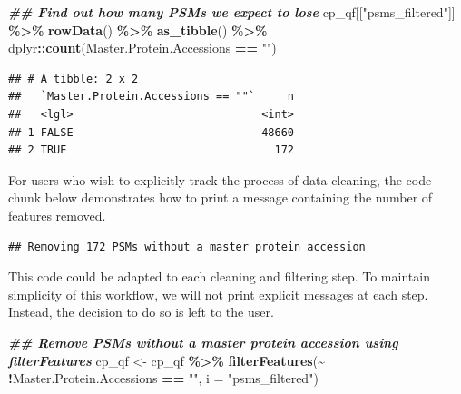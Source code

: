 \documentclass[9pt,a4paper,]{extarticle}
\newenvironment{Shaded}{\begin{snugshade}}{\end{snugshade}}
\newcommand{\AttributeTok}[1]{\textcolor[rgb]{0.13,0.29,0.53}{#1}}
\newcommand{\DocumentationTok}[1]{\textcolor[rgb]{0.56,0.35,0.01}{\textbf{\textit{#1}}}}
\newcommand{\FunctionTok}[1]{\textcolor[rgb]{0.13,0.29,0.53}{\textbf{#1}}}
\newcommand{\NormalTok}[1]{#1}
\newcommand{\OtherTok}[1]{\textcolor[rgb]{0.56,0.35,0.01}{#1}}
\newcommand{\SpecialCharTok}[1]{\textcolor[rgb]{0.81,0.36,0.00}{\textbf{#1}}}
\newcommand{\StringTok}[1]{\textcolor[rgb]{0.31,0.60,0.02}{#1}}
\begin{document}
\begin{Shaded}
\begin{Highlighting}[]
\DocumentationTok{\#\# Find out how many PSMs we expect to lose}
\NormalTok{cp\_qf[[}\StringTok{"psms\_filtered"}\NormalTok{]] }\SpecialCharTok{\%\textgreater{}\%} 
  \FunctionTok{rowData}\NormalTok{() }\SpecialCharTok{\%\textgreater{}\%} 
  \FunctionTok{as\_tibble}\NormalTok{() }\SpecialCharTok{\%\textgreater{}\%} 
\NormalTok{  dplyr}\SpecialCharTok{::}\FunctionTok{count}\NormalTok{(Master.Protein.Accessions }\SpecialCharTok{==} \StringTok{""}\NormalTok{)}
\end{Highlighting}
\end{Shaded}

\begin{verbatim}
## # A tibble: 2 x 2
##   `Master.Protein.Accessions == ""`     n
##   <lgl>                             <int>
## 1 FALSE                             48660
## 2 TRUE                                172
\end{verbatim}

For users who wish to explicitly track the process of data cleaning, the code
chunk below demonstrates how to print a message containing the number of features
removed.

\begin{Shaded}
\end{Shaded}

\begin{verbatim}
## Removing 172 PSMs without a master protein accession
\end{verbatim}

This code could be adapted to each cleaning and filtering step. To maintain
simplicity of this workflow, we will not print explicit messages at each step.
Instead, the decision to do so is left to the user.

\begin{Shaded}
\begin{Highlighting}[]
\DocumentationTok{\#\# Remove PSMs without a master protein accession using filterFeatures}
\NormalTok{cp\_qf }\OtherTok{\textless{}{-}}\NormalTok{ cp\_qf }\SpecialCharTok{\%\textgreater{}\%}
  \FunctionTok{filterFeatures}\NormalTok{(}\SpecialCharTok{\textasciitilde{}} \SpecialCharTok{!}\NormalTok{Master.Protein.Accessions }\SpecialCharTok{==} \StringTok{""}\NormalTok{,}
                 \AttributeTok{i =} \StringTok{"psms\_filtered"}\NormalTok{)}
\end{Highlighting}
\end{Shaded}
\end{document}
